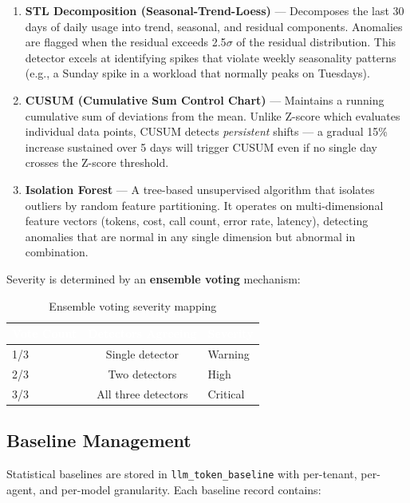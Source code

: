 \documentclass[12pt,a4paper,twoside]{report}
\begin{document}
\begin{enumerate}
  \item \textbf{STL Decomposition (Seasonal-Trend-Loess)} — Decomposes the last 30 days of daily usage into trend, seasonal, and residual components. Anomalies are flagged when the residual exceeds 2.5$\sigma$ of the residual distribution. This detector excels at identifying spikes that violate weekly seasonality patterns (e.g., a Sunday spike in a workload that normally peaks on Tuesdays).

  \item \textbf{CUSUM (Cumulative Sum Control Chart)} — Maintains a running cumulative sum of deviations from the mean. Unlike Z-score which evaluates individual data points, CUSUM detects \textit{persistent} shifts — a gradual 15\% increase sustained over 5 days will trigger CUSUM even if no single day crosses the Z-score threshold.

  \item \textbf{Isolation Forest} — A tree-based unsupervised algorithm that isolates outliers by random feature partitioning. It operates on multi-dimensional feature vectors (tokens, cost, call count, error rate, latency), detecting anomalies that are normal in any single dimension but abnormal in combination.
\end{enumerate}

Severity is determined by an \textbf{ensemble voting} mechanism:

\begin{table}[H]
\centering
\begin{tabular}{|l|c|l|}
\hline
\rowcolor{tabheader}
\textcolor{white}{\textbf{Vote Count}} &
\textcolor{white}{\textbf{Detectors Agreeing}} &
\textcolor{white}{\textbf{Severity}} \\
\hline
1/3 & Single detector & Warning \\
\hline
2/3 & Two detectors & High \\
\hline
3/3 & All three detectors & Critical \\
\hline
\end{tabular}
\caption{Ensemble voting severity mapping}
\end{table}

\subsection{Baseline Management}

Statistical baselines are stored in \texttt{llm\_token\_baseline} with per-tenant, per-agent, and per-model granularity. Each baseline record contains:
\end{document}
